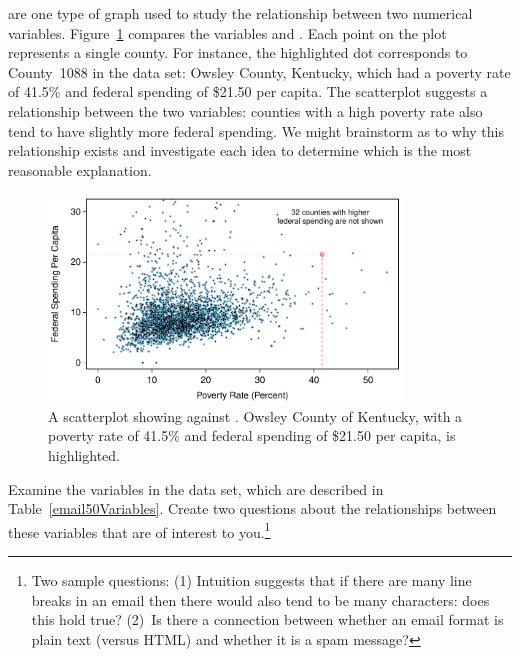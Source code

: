  are one type of graph used to study the relationship between two numerical variables. Figure~\ref{county_fed_spendVsPoverty} compares the variables  and . Each point on the plot represents a single county. For instance, the highlighted dot corresponds to County~1088 in the  data set: Owsley County, Kentucky, which had a poverty rate of 41.5\% and federal spending of \$21.50 per capita. The scatterplot suggests a relationship between the two variables: counties with a high poverty rate also tend to have slightly more federal spending. We might brainstorm as to why this relationship exists and investigate each idea to determine which is the most reasonable explanation.

\begin{figure}
\centering
\includegraphics[width=0.84\textwidth]{ch_data_collection/figures/county_fed_spendVsPoverty/county_fed_spendVsPoverty}
\caption{A scatterplot showing  against . Owsley County of Kentucky, with a poverty rate of 41.5\% and federal spending of \$21.50 per capita, is highlighted.}
\label{county_fed_spendVsPoverty}
\end{figure}

\begin{exercise}
Examine the variables in the  data set, which are described in Table~\vref{email50Variables}. Create two questions about the relationships between these variables that are of interest to you.\footnote{Two sample questions: (1) Intuition suggests that if there are many line breaks in an email then there would also tend to be many characters: does this hold true? (2)~Is there a connection between whether an email format is plain text (versus HTML) and whether it is a spam message?}
\end{exercise}

